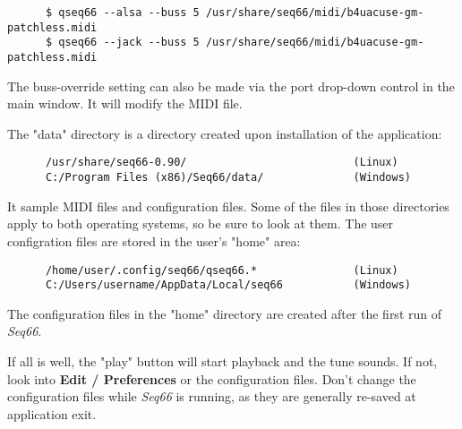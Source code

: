    \begin{verbatim}
      $ qseq66 --alsa --buss 5 /usr/share/seq66/midi/b4uacuse-gm-patchless.midi
      $ qseq66 --jack --buss 5 /usr/share/seq66/midi/b4uacuse-gm-patchless.midi
   \end{verbatim}

   The buss-override setting can also be made via the port drop-down control
   in the main window. It will modify the MIDI file.

   The "data" directory is a directory created upon installation of the
   application:

   \begin{verbatim}
      /usr/share/seq66-0.90/                          (Linux)
      C:/Program Files (x86)/Seq66/data/              (Windows)
   \end{verbatim}

   It sample MIDI files and configuration files.
   Some of the files in those directories apply to both operating systems, so
   be sure to look at them.
   The user configration files are stored in the user's "home" area:

   \begin{verbatim}
      /home/user/.config/seq66/qseq66.*               (Linux)
      C:/Users/username/AppData/Local/seq66           (Windows)
   \end{verbatim}

   The configuration files in the "home" directory
   are created after the first run of \textsl{Seq66}.

   If all is well, the "play" button will start playback and the tune sounds.
   If not, look into \textbf{Edit / Preferences} or the configuration files.
   Don't change the configuration files while \textsl{Seq66} is running, as
   they are generally re-saved at application exit.

